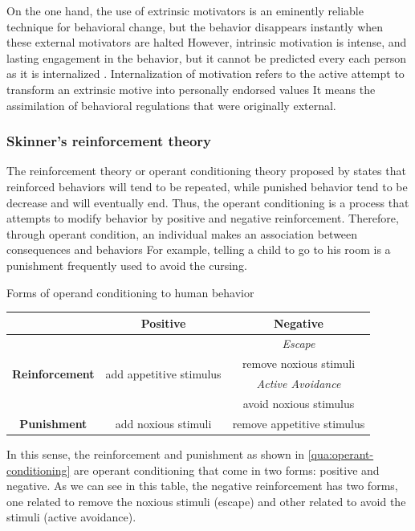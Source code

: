 On the one hand, the use of extrinsic motivators is an eminently reliable technique for behavioral change, but the behavior disappears instantly when these external motivators are halted \cite{HaggerChatzisarantis2007}
However, intrinsic motivation is intense, and lasting engagement in the behavior, but it cannot be predicted every each person as it is internalized \cite{DeciRyan2010}.
Internalization of motivation refers to the active attempt to transform an extrinsic motive into personally endorsed values
It means the assimilation of behavioral regulations that were originally external.


\subsubsection{Skinner's reinforcement theory}
\label{subsubsec:operant-conditioning}

The reinforcement theory or operant conditioning theory proposed by  states that reinforced behaviors will tend to be repeated, while punished behavior tend to be decrease and will eventually end.
Thus, the operant conditioning is a process that attempts to modify behavior by positive and negative reinforcement.
Therefore, through operant condition, an individual makes an association between consequences and behaviors
For example, telling a child to go to his room is a punishment frequently used to avoid the cursing.

\begin{quadro}[htb]
\caption{Forms of operand conditioning to human behavior}
\label{qua:operant-conditioning}
\centering
\scriptsize
\begin{tabular}{|c|c|c|} \hline
 & \textbf{Positive} & \textbf{Negative} \\ \hline
\multirow{4}{*}{\textbf{Reinforcement}} & \multirow{4}{*}{add appetitive stimulus} & \emph{Escape} \\
 & & remove noxious stimuli \\ \cline{3-3}
 & & \emph{Active Avoidance} \\
 & & avoid noxious stimulus \\ \hline
\textbf{Punishment} & add noxious stimuli & remove appetitive stimulus \\ \hline
\end{tabular}
 \fautor
\end{quadro}

In this sense, the reinforcement and punishment as shown in  \autoref{qua:operant-conditioning} are operant conditioning that come in two forms: positive and negative.
As we can see in this table, the negative reinforcement has two forms, one related to remove the noxious stimuli (escape) and other related to avoid the stimuli (active avoidance).


